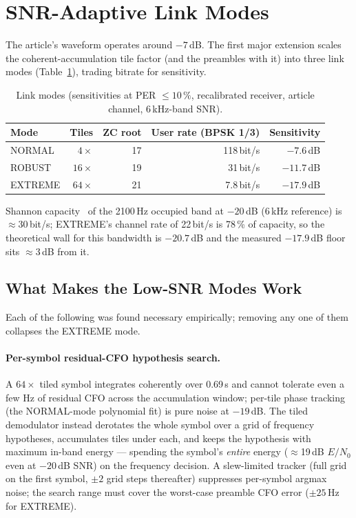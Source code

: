 \section{SNR-Adaptive Link Modes}
\label{sec:modes}

The article's waveform operates around $-7$\,dB.  The first major
extension scales the coherent-accumulation tile factor (and the
preambles with it) into three link modes
(Table~\ref{tab:modes}), trading bitrate for sensitivity.

\begin{table}[H]
    \centering
    \caption{Link modes (sensitivities at PER $\le 10\,\%$,
             recalibrated receiver, article channel, 6\,kHz-band SNR).}
    \label{tab:modes}
    \small
    \begin{tabular}{@{}lrrrr@{}}
    \toprule
    \textbf{Mode} & \textbf{Tiles} & \textbf{ZC root} &
    \textbf{User rate (BPSK 1/3)} & \textbf{Sensitivity} \\
    \midrule
    NORMAL  & $4\times$  & 17 & 118\,bit/s & $-7.6$\,dB \\
    ROBUST  & $16\times$ & 19 & 31\,bit/s  & $-11.7$\,dB \\
    EXTREME & $64\times$ & 21 & 7.8\,bit/s & $-17.9$\,dB \\
    \bottomrule
    \end{tabular}
\end{table}

Shannon capacity~\cite{shannon1948} of the 2100\,Hz occupied band at
$-20$\,dB (6\,kHz reference) is $\approx$30\,bit/s; EXTREME's channel
rate of 22\,bit/s is 78\,\% of capacity, so the theoretical wall for
this bandwidth is $-20.7$\,dB and the measured $-17.9$\,dB floor sits
$\approx$3\,dB from it.

\subsection{What Makes the Low-SNR Modes Work}

Each of the following was found necessary empirically; removing any one
of them collapses the EXTREME mode.

\paragraph{Per-symbol residual-CFO hypothesis search.}  A $64\times$
tiled symbol integrates coherently over 0.69\,s and cannot tolerate
even a few Hz of residual CFO across the accumulation window; per-tile
phase tracking (the NORMAL-mode polynomial fit) is pure noise at
$-19$\,dB.  The tiled demodulator instead derotates the whole symbol
over a grid of frequency hypotheses, accumulates tiles under each, and
keeps the hypothesis with maximum in-band energy --- spending the
symbol's \emph{entire} energy ($\approx$19\,dB $E/N_0$ even at
$-20$\,dB SNR) on the frequency decision.  A slew-limited tracker
(full grid on the first symbol, $\pm 2$ grid steps thereafter)
suppresses per-symbol argmax noise; the search range must cover the
worst-case preamble CFO error ($\pm 25$\,Hz for EXTREME).

